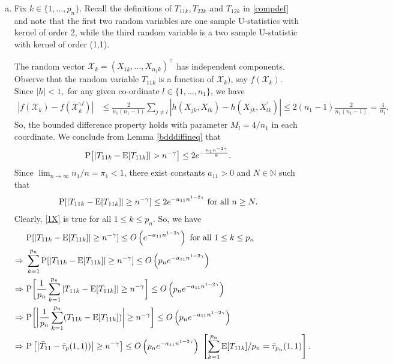 \documentclass[twoside]{article}
\newcommand{\0}{\mathbf{0}}
\newcommand{\1}{\mathbf{1}}
\numberwithin{equation}{section}
\begin{document}
\begin{enumerate}[(a)]
 \item Fix $k\in\{1,\ldots,p_n\}$. Recall the definitions of ${T}_{11k},{T}_{22k}$ and ${T}_{12k}$ in \eqref{compdef} and note that the first two random variables are one sample U-statistics with kernel of order 2, while the third random variable is a two sample U-statistic with kernel of order (1,1).

The random vector $\mathcal{X}_k=(X_{1k},\ldots,X_{n_1k})^\top$ has independent components. Observe that the random variable $T_{11k}$ is a function of $\mathcal{X}_k)$, say  $f(\mathcal{X}_k).$ Since $|h|<1,$ for any given co-ordinate $l\in\{1,\ldots, n_1\}$, we have
\begin{align*}
 |f(\mathcal{X}_k)-f(\mathcal{X}_k^{\backslash l})|&\leq \frac{2}{n_1(n_1-1)}\sum\limits_{j\neq l}\left |h(X_{jk},X_{lk})-h(X_{jk},X^\prime_{lk})\right |\leq 2(n_1-1)\frac{2}{n_1(n_1-1)}=\frac{4}{n_1}.
\end{align*}
So, the bounded difference property holds with parameter $M_l=4/n_1$ in each coordinate. We conclude from Lemma \ref{bdddiffineq} that
\begin{align}\label{0X}
 {\rm P}\big [|{T}_{11k}-{\rm E}[{T}_{11k}]|>n^{-\gamma} \big]\leq 2e^{- \frac{n_1 n^{-2\gamma}}{8}}.
\end{align}
Since $\lim_{n\to\infty}n_1/n=\pi_1<1$, there exist  constants $a_{11}>0$ and $N\in\mathbb{N}$ such that
\begin{align}\label{1X}
 {\rm P}[|{T}_{11k} - {\rm E}[{T}_{11k}]|\geq n^{-\gamma}]\leq 2e^{-{a_{11} n^{1-2\gamma}}}\text{ for all }n\geq N.
\end{align}
Clearly, \eqref{1X} is true for all $1\le k\le p_n$. So, we have
\begin{align}\label{ref11}
 &\ {\rm P}[|{T}_{11k} - {\rm E}[ {T}_{11k}]|\geq n^{-\gamma}]\leq O\left (e^{-{a_{11} n^{1-2\gamma}}}\right )\text{ for all }1\le k\le p_n\nonumber \\
 \Rightarrow &\ \sum\limits_{k=1}^{p_n}{\rm P}[|{T}_{11k} - {\rm E}[ {T}_{11k}]|\geq n^{-\gamma}]\leq O\left (p_n e^{-{a_{11} n^{1-2\gamma}}}\right )\nonumber \\
 \Rightarrow &\ {\rm P}\bigg [\frac{1}{p_n}\sum\limits_{k=1}^{p_n}|{T}_{11k} - {\rm E}[ {T}_{11k}]|\geq n^{-\gamma} \bigg]\leq O\left (p_n e^{-{a_{11} n^{1-2\gamma}}}\right )\nonumber \\
 \Rightarrow &\ {\rm P}\bigg [\bigg |\frac{1}{p_n}\sum\limits_{k=1}^{p_n}({T}_{11k} - {\rm E}[ {T}_{11k}])\bigg |\geq n^{-\gamma} \bigg]\leq O\left (p_n e^{-{a_{11} n^{1-2\gamma}}}\right )\nonumber \\
 \Rightarrow &\ {\rm P} \left [ \left |\bar{T}_{11} - \bar{\tau}_p(1,1)) \right |\geq n^{-\gamma} \right ]\leq O\left (p_n e^{-{a_{11} n^{1-2\gamma}}}\right )\ \left [\sum_{k=1}^{p_n}{\rm E}[ {T}_{11k}]/p_n = \bar{\tau}_{p_n}(1,1)\right ].
\end{align}


\end{enumerate}
\end{document}
